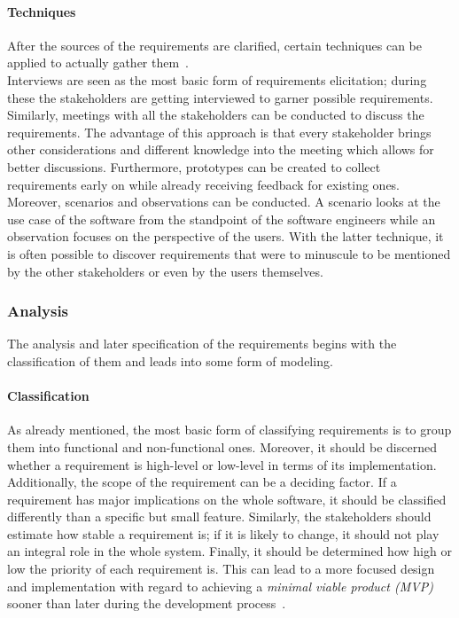 \documentclass[12pt,a4paper,twoside]{report}
\begin{document}
\paragraph{Techniques}
After the sources of the requirements are clarified, certain techniques can be
applied to actually gather them~\cite{sommerville-se, swebok}.\\
Interviews are seen as the most basic form of requirements elicitation;
during these the stakeholders are getting interviewed to garner possible requirements.
Similarly, meetings with all the stakeholders can be conducted to discuss the requirements.
The advantage of this approach is that every stakeholder brings other considerations and
different knowledge into the meeting which allows for better discussions.
Furthermore, prototypes can be created to collect requirements early on while already
receiving feedback for existing ones. Moreover, scenarios and observations can be
conducted. A scenario looks at the use case of the software from the standpoint
of the software engineers while an observation focuses on the perspective of the
users. With the latter technique, it is often possible to discover requirements
that were to minuscule to be mentioned by the other stakeholders or even by the users themselves.


\subsubsection{Analysis}

The analysis and later specification of the requirements begins with the classification
of them and leads into some form of modeling.

\paragraph{Classification}
As already mentioned, the most basic form of classifying requirements is to group
them into functional and non-functional ones. Moreover, it should be discerned
whether a requirement is high-level or low-level in terms of its implementation.
Additionally, the scope of the requirement can be a deciding factor.
If a requirement has major implications on the whole software, it should be classified
differently than a specific but small feature. Similarly, the stakeholders should
estimate how stable a requirement is; if it is likely to change, it should not
play an integral role in the whole system.
Finally, it should be determined how high or low the priority of each requirement is.
This can lead to a more focused design and implementation with regard to achieving
a \textit{minimal viable product (MVP)} sooner than later during
the development process~\cite{swebok, sommerville-se}.
\end{document}
